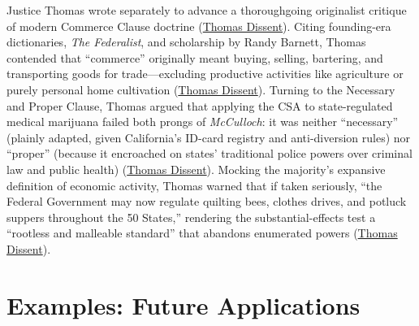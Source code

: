 \documentclass[12pt]{article}
\begin{document}
Justice Thomas wrote separately to advance a thoroughgoing originalist critique of modern Commerce Clause doctrine (\href{https://www.law.cornell.edu/supct/html/03-1454.ZD1.html}{Thomas Dissent}). Citing founding-era dictionaries, \textit{The Federalist}, and scholarship by Randy Barnett, Thomas contended that ``commerce'' originally meant buying, selling, bartering, and transporting goods for trade---excluding productive activities like agriculture or purely personal home cultivation (\href{https://www.law.cornell.edu/supct/html/03-1454.ZD1.html}{Thomas Dissent}). Turning to the Necessary and Proper Clause, Thomas argued that applying the CSA to state-regulated medical marijuana failed both prongs of \textit{McCulloch}: it was neither ``necessary'' (plainly adapted, given California's ID-card registry and anti-diversion rules) nor ``proper'' (because it encroached on states' traditional police powers over criminal law and public health) (\href{https://www.law.cornell.edu/supct/html/03-1454.ZD1.html}{Thomas Dissent}). Mocking the majority's expansive definition of economic activity, Thomas warned that if taken seriously, ``the Federal Government may now regulate quilting bees, clothes drives, and potluck suppers throughout the 50 States,'' rendering the substantial-effects test a ``rootless and malleable standard'' that abandons enumerated powers (\href{https://www.law.cornell.edu/supct/html/03-1454.ZD1.html}{Thomas Dissent}).

\section{Examples: Future Applications}
\end{document}
